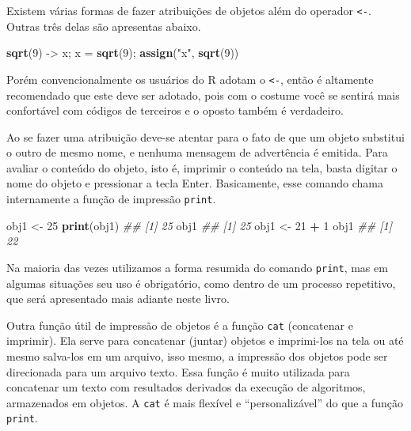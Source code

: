 \documentclass[
  11pt,
  a5paper,
  openany]{book}
\newenvironment{Shaded}{\begin{snugshade}}{\end{snugshade}}
\newcommand{\CommentTok}[1]{\textcolor[rgb]{0.56,0.35,0.01}{\textit{#1}}}
\newcommand{\DecValTok}[1]{\textcolor[rgb]{0.00,0.00,0.81}{#1}}
\newcommand{\KeywordTok}[1]{\textcolor[rgb]{0.13,0.29,0.53}{\textbf{#1}}}
\newcommand{\NormalTok}[1]{#1}
\newcommand{\OperatorTok}[1]{\textcolor[rgb]{0.81,0.36,0.00}{\textbf{#1}}}
\newcommand{\StringTok}[1]{\textcolor[rgb]{0.31,0.60,0.02}{#1}}
\begin{document}
Existem várias formas de fazer atribuições de objetos além do operador \texttt{\textless{}-}. Outras três delas são apresentas abaixo.

\begin{Shaded}
\begin{Highlighting}[]
\KeywordTok{sqrt}\NormalTok{(}\DecValTok{9}\NormalTok{) ->}\StringTok{ }\NormalTok{x; x =}\StringTok{ }\KeywordTok{sqrt}\NormalTok{(}\DecValTok{9}\NormalTok{); }\KeywordTok{assign}\NormalTok{(}\StringTok{"x"}\NormalTok{, }\KeywordTok{sqrt}\NormalTok{(}\DecValTok{9}\NormalTok{))}
\end{Highlighting}
\end{Shaded}

Porém convencionalmente os usuários do R adotam o \texttt{\textless{}-}, então é altamente recomendado que este deve ser adotado, pois com o costume você se sentirá mais confortável com códigos de terceiros e o oposto também é verdadeiro.

Ao se fazer uma atribuição deve-se atentar para o fato de que um objeto substitui o outro de mesmo nome, e nenhuma mensagem de advertência é emitida. Para avaliar o conteúdo do objeto, isto é, imprimir o conteúdo na tela, basta digitar o nome do objeto e pressionar a tecla Enter. Basicamente, esse comando chama internamente a função de impressão \texttt{print}.

\begin{Shaded}
\begin{Highlighting}[]
\NormalTok{obj1 <-}\StringTok{ }\DecValTok{25}
\KeywordTok{print}\NormalTok{(obj1)}
\CommentTok{## [1] 25}
\NormalTok{obj1}
\CommentTok{## [1] 25}
\NormalTok{obj1 <-}\StringTok{ }\DecValTok{21} \OperatorTok{+}\StringTok{ }\DecValTok{1}
\NormalTok{obj1}
\CommentTok{## [1] 22}
\end{Highlighting}
\end{Shaded}

Na maioria das vezes utilizamos a forma resumida do comando \texttt{print}, mas em algumas situações seu uso é obrigatório, como dentro de um processo repetitivo, que será apresentado mais adiante neste livro.

Outra função útil de impressão de objetos é a função \texttt{cat} (concatenar e imprimir). Ela serve para concatenar (juntar) objetos e imprimi-los na tela ou até mesmo salva-los em um arquivo, isso mesmo, a impressão dos objetos pode ser direcionada para um arquivo texto. Essa função é muito utilizada para concatenar um texto com resultados derivados da execução de algoritmos, armazenados em objetos. A \texttt{cat} é mais flexível e ``personalizável'' do que a função \texttt{print}.
\end{document}
